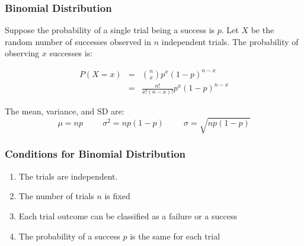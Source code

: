 \documentclass[handout]{beamer}
\begin{document}
\begin{frame}
\frametitle{Binomial Distribution}
%
%
Suppose the probability of a single trial being a success is $p$.  Let $X$ be the random number of successes observed in $n$ independent trials.  The probability of observing $x$ successes is:

\pause\begin{eqnarray*}
P(X=x) &=& {n \choose x} p^x (1-p)^{n-x}\\
&=& \frac{n!}{x!(n-x)!}p^x (1-p)^{n-x}
\end{eqnarray*}

\pause The mean, variance, and SD are:
\[
\mu = np \hspace{1cm} \sigma^2 = np(1-p) \hspace{1cm} \sigma = \sqrt{np(1-p)}
\]

\end{frame}


\begin{frame}
\frametitle{Conditions for Binomial Distribution}

%
%
\begin{enumerate}
\pause\item The trials are independent.
\pause\item The number of trials $n$ is fixed
\pause\item Each trial outcome can be classified as a failure or a success
\pause\item The probability of a success $p$ is the same for each trial
\end{enumerate}

\end{frame}
\end{document}
